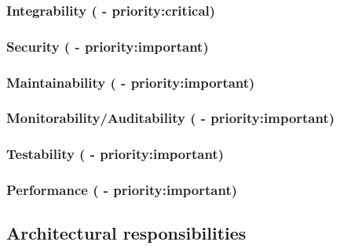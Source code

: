 \documentclass[a4paper,11pt,titlepage]{article}
\begin{document}
		\subsubsection{Integrability ( - priority:critical)} \label{sec:integrability}
			
		
		\subsubsection{Security ( - priority:important)} \label{sec:security}
			
			
		\subsubsection{Maintainability ( - priority:important)} \label{sec:maintainability}
			
			
		\subsubsection{Monitorability/Auditability ( - priority:important)} \label{sec:auditability}
			
			
		\subsubsection{Testability ( - priority:important)} \label{sec:testability}
			
			
		\subsubsection{Performance ( - priority:important)} \label{sec:performance}
			
				
	\newpage
	\subsection{Architectural responsibilities}
		
				
\end{document}
